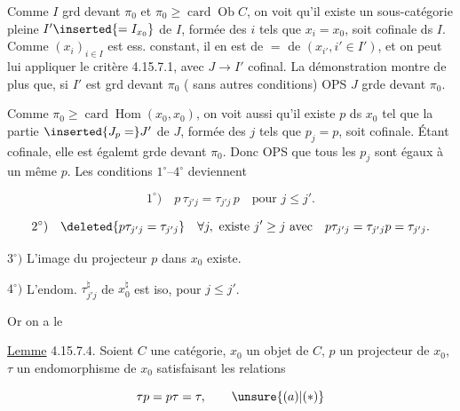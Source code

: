 
Comme $I$ grd devant $\pi_0$ et $\pi_0\geq\operatorname{card}\operatorname{Ob} C$, on voit qu'il existe un  sous-catégorie pleine $I'\inserted{=I_{x_0}}$ de $I$,  formée des $i$ tels que $x_i=x_0$, soit cofinale ds $I$.  Comme $(x_i)_{i\in I}$ est ess. constant, il en est de $=$ de $(x_{i'},i'\in I')$, et on peut lui appliquer le critère 4.15.7.1, avec $J\to I'$ cofinal. La démonstration montre de plus que, si $I'$ est grd devant $\pi_0$ ( sans autres conditions) OPS $J$ grde devant $\pi_0$. 


Comme $\pi_0\geq\operatorname{card}\operatorname{Hom}(x_0,x_0)$, on voit aussi qu'il existe   $p$ ds $x_0$ tel que la partie  $\inserted{J_p=}J'$ de $J$,  formée des $j$ tels que $p_j=p$, soit cofinale. Étant cofinale, elle est égalemt grde devant $\pi_0$. Donc OPS que tous les $p_j$ sont égaux à un même $p$. Les conditions $1^\circ$--$4^\circ$ deviennent

\[1^\circ)\quad p\,\tau_{j'j}=\tau_{j'j}\,p\quad\text{pour }j\leq j'.\]

\[2^\circ)\quad\deleted{p\tau_{j'j}=\tau_{j'j}}\quad\forall j,\ \text{existe }j'\geq j\ \text{avec}\quad p\tau_{j'j}=\tau_{j'j}p=\tau_{j'j}.\]

$3^\circ)$ \deleted{\unsure{$\forall$}} L'image  du projecteur $p$ dans $x_0$ existe.

$4^\circ)$ L'endom. $\tau_{j'j}^\natural$ de $x_0^\natural$ est iso, pour $j\leq j'$.

Or on a le

\uline{Lemme} 4.15.7.4. Soient $C$ une catégorie, $x_0$ un objet de $C$, $p$ un projecteur de $x_0$, $\tau$ un endomorphisme de $x_0$ satisfaisant les relations

\begingroup\makeatletter\tagsleft@true\makeatother
\[\tau p=p\tau=\tau,\tag*{$\unsure{(a)|(*)}$}\]
\endgroup

